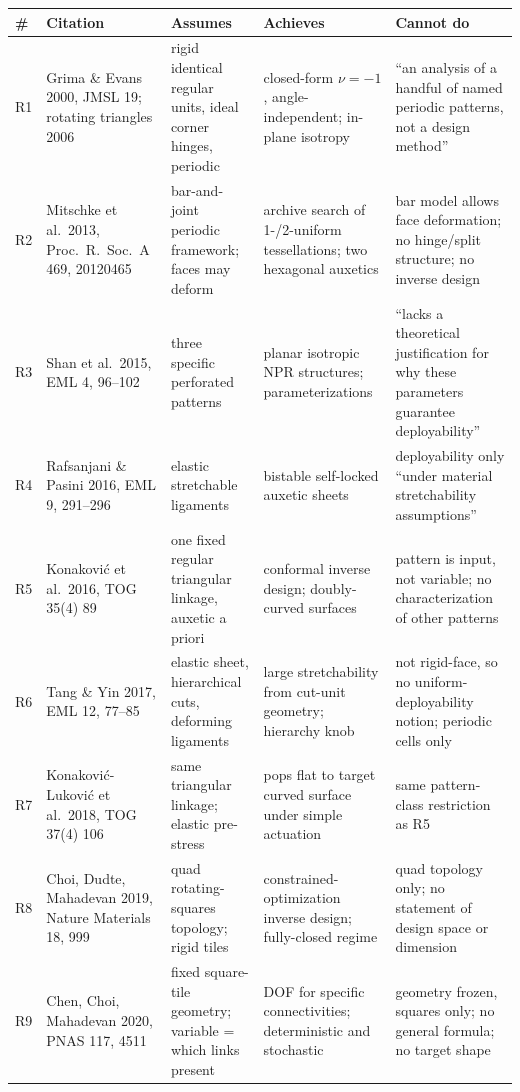 \documentclass[10pt,a4paper]{article}
\begin{document}
\begin{longtable}{@{}p{6mm}p{36mm}p{40mm}p{38mm}p{40mm}@{}}
\toprule
\# & Citation & Assumes & Achieves & Cannot do \\
\midrule
\endhead
R1 & Grima \& Evans 2000, JMSL 19; rotating triangles 2006 & rigid identical regular units, ideal corner hinges, periodic & closed-form $\nu=-1$, angle-independent; in-plane isotropy & ``an analysis of a handful of named periodic patterns, not a design method'' \\
R2 & Mitschke et al.\ 2013, Proc.\ R.\ Soc.\ A 469, 20120465 & bar-and-joint periodic framework; faces may deform & archive search of 1-/2-uniform tessellations; two hexagonal auxetics & bar model allows face deformation; no hinge/split structure; no inverse design \\
R3 & Shan et al.\ 2015, EML 4, 96--102 & three specific perforated patterns & planar isotropic NPR structures; parameterizations & ``lacks a theoretical justification for why these parameters guarantee deployability'' \\
R4 & Rafsanjani \& Pasini 2016, EML 9, 291--296 & elastic stretchable ligaments & bistable self-locked auxetic sheets & deployability only ``under material stretchability assumptions'' \\
R5 & Konakovi\'c et al.\ 2016, TOG 35(4) 89 & one fixed regular triangular linkage, auxetic a priori & conformal inverse design; doubly-curved surfaces & pattern is input, not variable; no characterization of other patterns \\
R6 & Tang \& Yin 2017, EML 12, 77--85 & elastic sheet, hierarchical cuts, deforming ligaments & large stretchability from cut-unit geometry; hierarchy knob & not rigid-face, so no uniform-deployability notion; periodic cells only \\
R7 & Konakovi\'c-Lukovi\'c et al.\ 2018, TOG 37(4) 106 & same triangular linkage; elastic pre-stress & pops flat to target curved surface under simple actuation & same pattern-class restriction as R5 \\
R8 & Choi, Dudte, Mahadevan 2019, Nature Materials 18, 999 & quad rotating-squares topology; rigid tiles & constrained-optimization inverse design; fully-closed regime & quad topology only; no statement of design space or dimension \\
R9 & Chen, Choi, Mahadevan 2020, PNAS 117, 4511 & fixed square-tile geometry; variable = which links present & DOF for specific connectivities; deterministic and stochastic & geometry frozen, squares only; no general formula; no target shape \\

\end{longtable}
\end{document}
